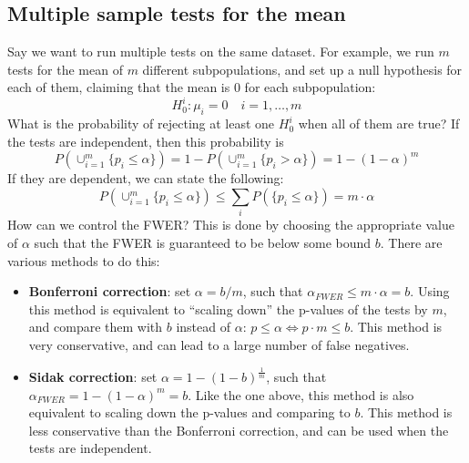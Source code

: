 \subsection{Multiple sample tests for the mean}
Say we want to run multiple tests on the same dataset. For example, we run $m$ tests for the mean of $m$ different subpopulations, and set up a null hypothesis for each of them, claiming that the mean is 0 for each subpopulation:
\begin{equation*}
    H_0^i : \mu_i = 0 \quad i = 1, \ldots, m
\end{equation*}
What is the probability of rejecting at least one $H_0^i$ when all of them are true? If the tests are independent, then this probability is
\begin{equation*}
    P(\cup_{i=1}^m \{p_i \leq \alpha\}) = 1 - P(\cup_{i=1}^m \{p_i > \alpha\}) = 1 - (1 - \alpha)^m
\end{equation*}
If they are dependent, we can state the following:
\begin{equation*}
    P(\cup_{i=1}^m \{p_i \leq \alpha\}) \leq \sum_i P(\{p_i \leq \alpha\}) = m \cdot \alpha
\end{equation*}
How can we control the FWER? This is done by choosing the appropriate value of $\alpha$ such that the FWER is guaranteed to be below some bound $b$. There are various methods to do this:
\begin{itemize}
    \item \textbf{Bonferroni correction}: set $\alpha = b/m$, such that $\alpha_{FWER} \leq m \cdot \alpha = b$. Using this method is equivalent to ``scaling down'' the p-values of the tests by $m$, and compare them with $b$ instead of $\alpha$: $p \leq \alpha \iff p \cdot m \leq b$. This method is very conservative, and can lead to a large number of false negatives.
    \item \textbf{Sidak correction}: set $\alpha = 1 - (1 - b)^{\frac{1}{m}}$, such that $\alpha_{FWER} = 1 - (1-\alpha)^m = b$. Like the one above, this method is also equivalent to scaling down the p-values and comparing to $b$. This method is less conservative than the Bonferroni correction, and can be used when the tests are independent.
\end{itemize}
